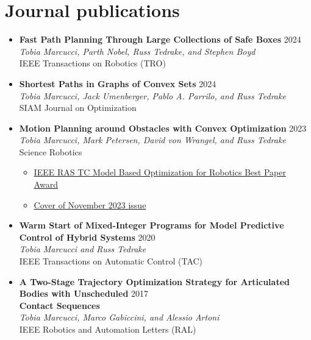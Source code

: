 \documentclass[11pt,a4paper,sans]{moderncv}
\begin{document}
\section{Journal publications}

\vspace{5pt}

\begin{itemize}
	
\item \textbf{Fast Path Planning Through Large Collections of Safe Boxes} \hfill 2024 \\
\textit{Tobia Marcucci, Parth Nobel, Russ Tedrake, and Stephen Boyd} \\
IEEE Transactions on Robotics (TRO)

\item \textbf{Shortest Paths in Graphs of Convex Sets} \hfill 2024 \\
\textit{Tobia Marcucci, Jack Umenberger, Pablo A. Parrilo, and Russ Tedrake} \\
SIAM Journal on Optimization

\item \textbf{Motion Planning around Obstacles with Convex Optimization} \hfill 2023 \\
\textit{Tobia Marcucci, Mark Petersen, David von Wrangel, and Russ Tedrake} \\
Science Robotics
\begin{itemize}
\item \href{https://www.tcoptrob.org/news/2024-06-12-best-paper/}{\color{cyan}IEEE RAS TC Model Based Optimization for Robotics Best Paper Award}
\item \href{https://www.science.org/toc/scirobotics/8/84}{\color{cyan}Cover of November 2023 issue}
\end{itemize} 

\item \textbf{Warm Start of Mixed-Integer Programs for Model Predictive Control of Hybrid Systems} \hfill 2020 \\
\textit{Tobia Marcucci and Russ Tedrake} \\
IEEE Transactions on Automatic Control (TAC)

\item \textbf{A Two-Stage Trajectory Optimization Strategy for Articulated Bodies with Unscheduled} \hfill 2017 \\
\textbf{Contact Sequences} \\
\textit{Tobia Marcucci, Marco Gabiccini, and Alessio Artoni} \\
IEEE Robotics and Automation Letters (RAL)

\end{itemize}
\end{document}
